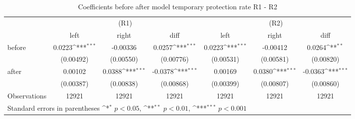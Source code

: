 \begin{table}[!ht]\centering \footnotesize
\def\sym#1{\ifmmode^{#1}\else\(^{#1}\)\fi}
\caption{Coefficients before after model temporary protection rate R1 - R2}
\begin{tabular}{l*{6}{c}}
\hline\hline
                    &\multicolumn{3}{c}{(R1)}&\multicolumn{3}{c}{(R2)}\\
&\multicolumn{1}{c}{left}&\multicolumn{1}{c}{right}&\multicolumn{1}{c}{diff}&\multicolumn{1}{c}{left}&\multicolumn{1}{c}{right}&\multicolumn{1}{c}{diff}\\
\hline
before              &      0.0223\sym{***}&    -0.00336         &      0.0257\sym{***}&      0.0223\sym{***}&    -0.00412         &      0.0264\sym{**} \\
                    &   (0.00492)         &   (0.00550)         &   (0.00776)         &   (0.00531)         &   (0.00581)         &   (0.00820)         \\
[0,5em]
after               &     0.00102         &      0.0388\sym{***}&     -0.0378\sym{***}&     0.00169         &      0.0380\sym{***}&     -0.0363\sym{***}\\
                    &   (0.00387)         &   (0.00838)         &   (0.00868)         &   (0.00399)         &   (0.00807)         &   (0.00860)         \\
\hline
Observations        &       12921         &       12921         &       12921         &       12921         &       12921         &       12921         \\
\hline\hline
\multicolumn{7}{l}{\footnotesize Standard errors in parentheses \sym{*} \(p<0.05\), \sym{**} \(p<0.01\), \sym{***} \(p<0.001\)}\\
\end{tabular}
\end{table}
